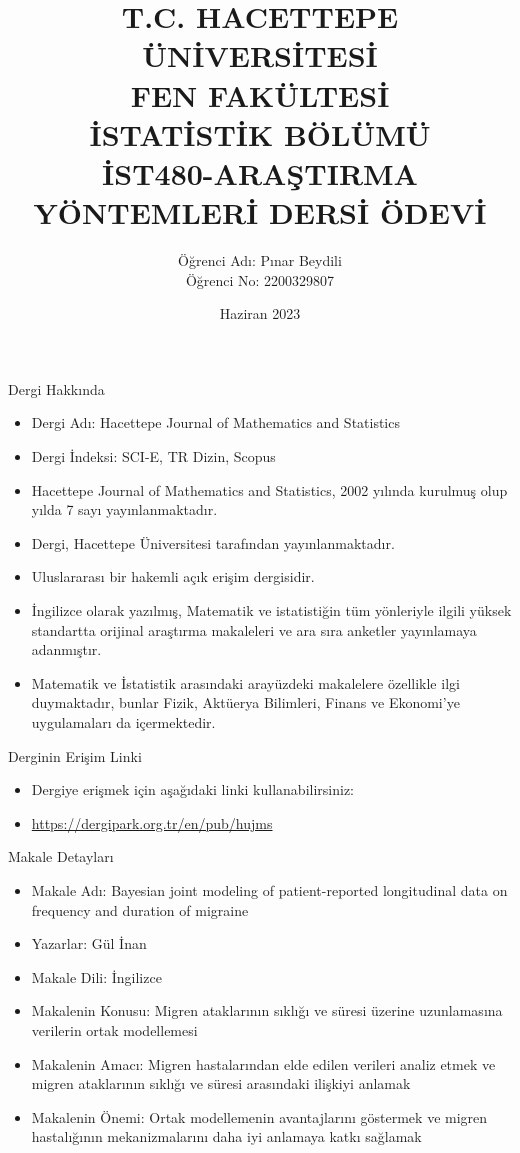 \documentclass{beamer}
\title{T.C. HACETTEPE ÜNİVERSİTESİ\\
FEN FAKÜLTESİ\\
İSTATİSTİK BÖLÜMÜ\\
İST480-ARAŞTIRMA YÖNTEMLERİ DERSİ ÖDEVİ}
\author{Öğrenci Adı: Pınar Beydili\\
Öğrenci No: 2200329807}
\date{Haziran 2023}
\begin{document}
\frame{\titlepage}

\begin{frame}{Dergi Hakkında}
\begin{itemize}

\item{Dergi Adı: Hacettepe Journal of Mathematics and Statistics}
\item{Dergi İndeksi: SCI-E, TR Dizin, Scopus}
  \item Hacettepe Journal of Mathematics and Statistics, 2002 yılında kurulmuş olup yılda 7 sayı yayınlanmaktadır.
  \item Dergi, Hacettepe Üniversitesi tarafından yayınlanmaktadır.
  \item Uluslararası bir hakemli açık erişim dergisidir.
  \item İngilizce olarak yazılmış, Matematik ve istatistiğin tüm yönleriyle ilgili yüksek standartta orijinal araştırma makaleleri ve ara sıra anketler yayınlamaya adanmıştır.
  \item Matematik ve İstatistik arasındaki arayüzdeki makalelere özellikle ilgi duymaktadır, bunlar Fizik, Aktüerya Bilimleri, Finans ve Ekonomi’ye uygulamaları da içermektedir.
\end{itemize}
\end{frame}

\begin{frame}{Derginin Erişim Linki}
\begin{itemize}
  \item Dergiye erişmek için aşağıdaki linki kullanabilirsiniz:
  \item \url{https://dergipark.org.tr/en/pub/hujms}
\end{itemize}
\end{frame}

\begin{frame}{Makale Detayları}
\begin{itemize}
  \item Makale Adı: Bayesian joint modeling of patient-reported longitudinal data on frequency and duration of migraine
  \item Yazarlar: Gül İnan
  \item Makale Dili: İngilizce
  \item Makalenin Konusu: Migren ataklarının sıklığı ve süresi üzerine uzunlamasına verilerin ortak modellemesi
  \item Makalenin Amacı: Migren hastalarından elde edilen verileri analiz etmek ve migren ataklarının sıklığı ve süresi arasındaki ilişkiyi anlamak
  \item Makalenin Önemi: Ortak modellemenin avantajlarını göstermek ve migren hastalığının mekanizmalarını daha iyi anlamaya katkı sağlamak
\end{itemize}
\end{frame}
\end{document}
